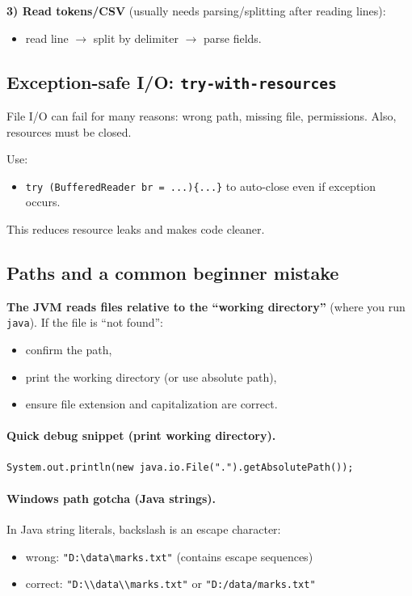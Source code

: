 \documentclass[11pt]{article}
\begin{document}
\textbf{3) Read tokens/CSV} (usually needs parsing/splitting after reading lines):
\begin{itemize}
  \item read line $\rightarrow$ split by delimiter $\rightarrow$ parse fields.
\end{itemize}

\subsection{Exception-safe I/O: \texttt{try-with-resources}}
File I/O can fail for many reasons: wrong path, missing file, permissions.
Also, resources must be closed.

Use:
\begin{itemize}
  \item \texttt{try (BufferedReader br = ...)\{...\}} to auto-close even if exception occurs.
\end{itemize}
This reduces resource leaks and makes code cleaner.

\subsection{Paths and a common beginner mistake}
\textbf{The JVM reads files relative to the ``working directory''} (where you run \texttt{java}).
If the file is ``not found'':
\begin{itemize}
  \item confirm the path,
  \item print the working directory (or use absolute path),
  \item ensure file extension and capitalization are correct.
\end{itemize}
\paragraph{Quick debug snippet (print working directory).}
\begin{lstlisting}
System.out.println(new java.io.File(".").getAbsolutePath());
\end{lstlisting}

\paragraph{Windows path gotcha (Java strings).}
In Java string literals, backslash is an escape character:
\begin{itemize}
  \item wrong: \verb|"D:\data\marks.txt"| (contains escape sequences)
  \item correct: \verb|"D:\\data\\marks.txt"| or \verb|"D:/data/marks.txt"|
\end{itemize}
\end{document}
